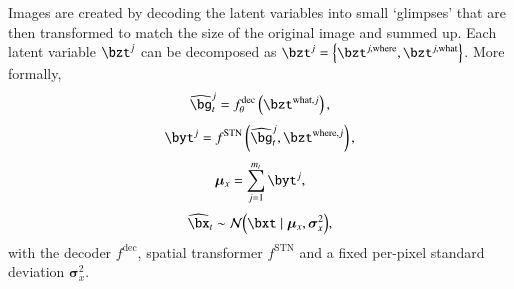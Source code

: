 Images are created by decoding the latent variables into small `glimpses' that are then transformed to match the size of the original image and summed up. Each latent variable $\bzt^j$ can be decomposed as $\bzt^j = \left\{ \bzt^{j, \mathrm{where}}, \bzt^{j, \mathrm{what}} \right\}$. More formally,
\begin{equation}
    \widehat{\bg}_t^j = f^{\mathrm{dec}}_\theta \left( \bzt^{\mathrm{what}, j} \right),
\end{equation}
\begin{equation}
    \byt^j = f^{\mathrm{STN}} \left( \widehat{\bg}_t^j, \bzt^{\mathrm{where}, j} \right),
\end{equation}
\begin{equation}
    \bm{\mu}_x = \sum_{j=1}^{m_t} \byt^j,
\end{equation}
\begin{equation}
    \widehat{\bx}_t \sim \gauss{ \bxt \mid \bm{\mu}_x, \bm{\sigma}_x^2},
\end{equation}
with the decoder $f^{\mathrm{dec}}$, spatial transformer $f^{\mathrm{STN}}$ and a fixed per-pixel standard deviation $\bm{\sigma}_x^2$.

